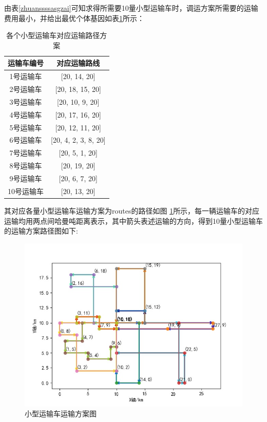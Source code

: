 \documentclass{whutmod}
\begin{document}
  由表\ref{zhuanssssasgzai}可知求得所需要10量小型运输车时，调运方案所需要的运输费用最小，并给出最优个体基因如表\ref{zhuansassgzai}所示：%
  
  	\begin{table}[H]

  	\centering		
  	\caption{各个小型运输车对应运输路径方案}\label{zhuansassgzai}
  	\begin{tabular}{cc}
  		\toprule[2pt]
  		\multicolumn{1}{m{5cm}}{\centering 运输车编号}
  		& \multicolumn{1}{m{5cm}}{\centering 对应运输路线}
  		\\
  		\midrule[1pt]
  		1号运输车 &  [20, 14, 20] \\ 
  		2号运输车 &  [20, 18, 15, 20] \\ 
  		3号运输车 &  [20, 10, 9, 20] \\ 
  		4号运输车 &  [20, 17, 16, 20] \\ 
  		5号运输车 &   [20, 12, 11, 20]\\ 
  		6号运输车 & [20, 4, 2, 3, 8, 20] \\ 
  		7号运输车 & [20, 5, 1, 20] \\ 
  		8号运输车 &  [20, 19, 20] \\ 
  		9号运输车 &   [20, 6, 7, 20] \\ 
  		10号运输车 & [20, 13, 20] \\
  		\bottomrule[2pt]	
  	\end{tabular}
  \end{table}
  
  其对应各量小型运输车运输方案为routes的路径如图 \ref{ssssssss}所示，每一辆运输车的对应运输均用两点间哈曼吨距离表示，其中箭头表述运输的方向，得到10量小型运输车的运输方案路径图如下:
  
  \begin{figure}[H]
  	\centering
  	\includegraphics[width=\textwidth]{figures/22.jpg}
  	\caption{小型运输车运输方案图}\label{ssssssss}
  \end{figure}
\end{document}
